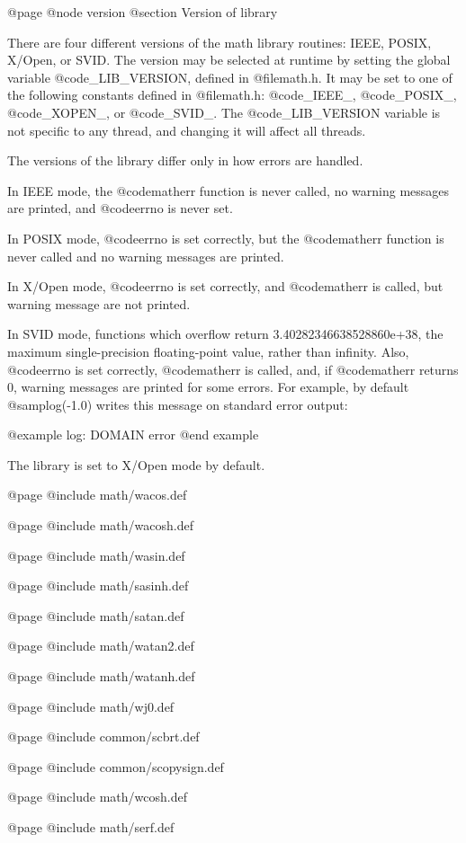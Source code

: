 @page
@node version
@section Version of library

There are four different versions of the math library routines: IEEE,
POSIX, X/Open, or SVID.  The version may be selected at runtime by
setting the global variable @code{_LIB_VERSION}, defined in
@file{math.h}.  It may be set to one of the following constants defined
in @file{math.h}: @code{_IEEE_}, @code{_POSIX_}, @code{_XOPEN_}, or
@code{_SVID_}.  The @code{_LIB_VERSION} variable is not specific to any
thread, and changing it will affect all threads.

The versions of the library differ only in how errors are handled.

In IEEE mode, the @code{matherr} function is never called, no warning
messages are printed, and @code{errno} is never set.

In POSIX mode, @code{errno} is set correctly, but the @code{matherr}
function is never called and no warning messages are printed.

In X/Open mode, @code{errno} is set correctly, and @code{matherr} is
called, but warning message are not printed.

In SVID mode, functions which overflow return 3.40282346638528860e+38,
the maximum single-precision floating-point value, rather than infinity.
Also, @code{errno} is set correctly, @code{matherr} is called, and, if
@code{matherr} returns 0, warning messages are printed for some errors.
For example, by default @samp{log(-1.0)} writes this message on standard
error output:

@example
log: DOMAIN error
@end example

The library is set to X/Open mode by default.

@page
@include math/wacos.def

@page
@include math/wacosh.def

@page
@include math/wasin.def

@page
@include math/sasinh.def

@page
@include math/satan.def

@page
@include math/watan2.def

@page
@include math/watanh.def

@page
@include math/wj0.def

@page
@include common/scbrt.def

@page
@include common/scopysign.def

@page
@include math/wcosh.def

@page
@include math/serf.def

